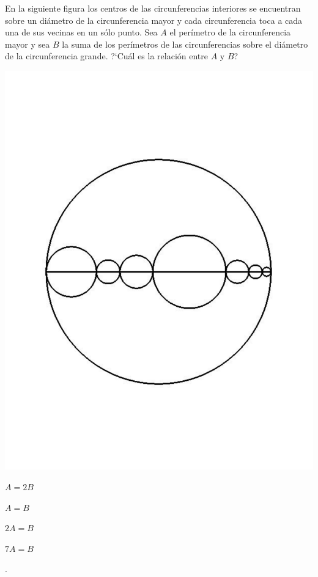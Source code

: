 \begin{Problema}{10}
  En la siguiente figura los centros de las circunferencias interiores
  se encuentran sobre un di\'ametro de la circunferencia mayor y cada
  circunferencia toca a cada una de sus vecinas en un s\'olo punto.
  Sea $A$ el per\'imetro de la circunferencia mayor y sea $B$ la suma
  de los per\'imetros de las circunferencias sobre el di\'ametro de la
  circunferencia grande. ?`Cu\'al es la relaci\'on entre $A$ y $B$?

  \begin{center}
    \includegraphics[scale=0.3,viewport=59 150 553 642]{circunferencias.pdf}
  \end{center}

  \begin{inparaenum}
  \item $A=2 B$ \espc
  \item $A=B$ \espc
  \item $2 A= B$ \espc
  \item $7 A = B$ \espc
  \item \nota.
  \end{inparaenum}
\end{Problema}

